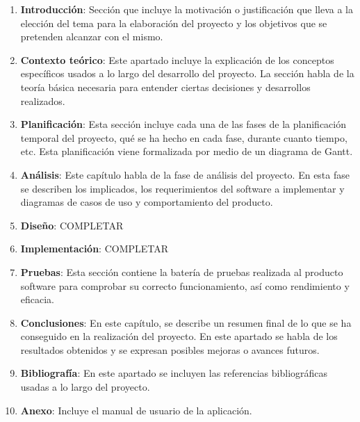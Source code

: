 \begin{enumerate}
	\item \textbf{Introducción}:
	Sección que incluye la motivación o justificación que lleva a la elección del tema para la elaboración del proyecto y los objetivos que se pretenden alcanzar con el mismo. 
	\item \textbf{Contexto teórico}:
	Este apartado incluye la explicación de los conceptos específicos usados a lo largo del desarrollo del proyecto. La sección habla de la teoría básica necesaria para entender ciertas decisiones y desarrollos realizados.
	\item \textbf{Planificación}: 
	Esta sección incluye cada una de las fases de la planificación temporal del proyecto, qué se ha hecho en cada fase, durante cuanto tiempo, etc. Esta planificación viene formalizada por medio de un diagrama de Gantt. %
	\item \textbf{Análisis}: 
	Este capítulo habla de la fase de análisis del proyecto. En esta fase se describen los implicados, los requerimientos del software a implementar y diagramas de casos de uso y comportamiento del producto.
	\item \textbf{Diseño}: 
	COMPLETAR
	\item \textbf{Implementación}: 
	COMPLETAR 
	\item \textbf{Pruebas}: 
	Esta sección contiene la batería de pruebas realizada al producto software para comprobar su correcto funcionamiento, así como rendimiento y eficacia.
	\item \textbf{Conclusiones}: 
	En este capítulo, se describe un resumen final de lo que se ha conseguido en la realización del proyecto. En este apartado se habla de los resultados obtenidos y se expresan posibles mejoras o avances futuros.
	\item \textbf{Bibliografía}: 
	En este apartado se incluyen las referencias bibliográficas usadas a lo largo del proyecto.
	\item \textbf{Anexo}: 
	Incluye el manual de usuario de la aplicación.
\end{enumerate}